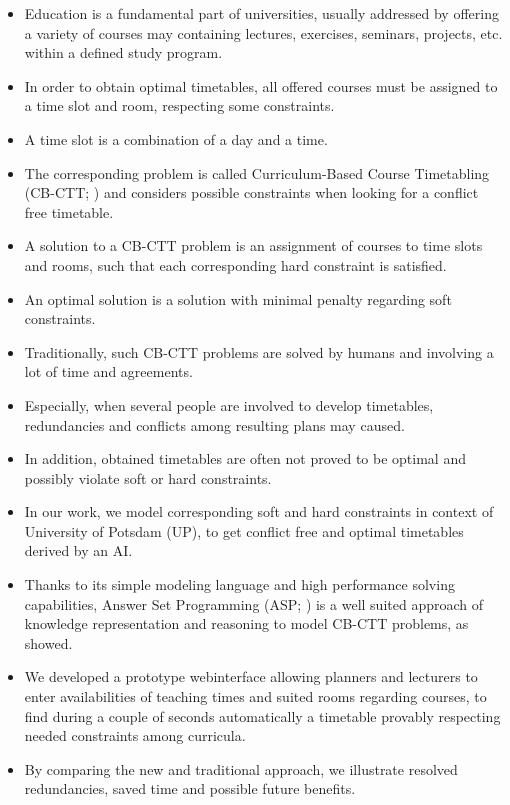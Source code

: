 \documentclass{easychair}
\newcommand{\CBCTT}{CB-CTT}
\newcommand{\UP}{UP}
\newcommand{\ASP}{ASP}
\begin{document}
\begin{itemize}%
  \item%
  Education is a fundamental part of universities, usually addressed by offering a variety of courses may containing lectures, exercises, seminars, projects, etc. within a defined study program. 
  \item%
  In order to obtain optimal timetables, all offered courses must be assigned to a time slot and room, respecting some constraints. 
  \item%
  A time slot is a combination of a day and a time.  
  \item%
  The corresponding problem is called Curriculum-Based Course Timetabling (\CBCTT{}; \cite{becaroto15}) and considers possible constraints when looking for a conflict free timetable. 
  \item%
  A solution to a \CBCTT{} problem is an assignment of courses to time slots and rooms, such that each corresponding hard constraint is satisfied. 
  \item%
  An optimal solution is a solution with minimal penalty regarding soft constraints. 
  \item%
  Traditionally, such \CBCTT{} problems are solved by humans and involving a lot of time and agreements. 
  \item%
  Especially, when several people are involved to develop timetables, redundancies and conflicts among resulting plans may caused. 
  \item%
  In addition, obtained timetables are often not proved to be optimal and possibly violate soft or hard constraints. 
  \item%
  In our work, we model corresponding soft and hard constraints in context of University of Potsdam (\UP{}), to get conflict free and optimal timetables derived by an AI. 
  \item%
  Thanks to its simple modeling language and high performance solving capabilities, Answer Set Programming (\ASP{}; \cite{baral02a}) is a well suited approach of knowledge representation and reasoning to model \CBCTT{} problems, as \cite{bainkaokscsotawa18a} showed.
  \item%
  We developed a prototype webinterface allowing planners and lecturers to enter availabilities of teaching times and suited rooms regarding courses, to find during a couple of seconds automatically a timetable provably respecting needed constraints among curricula. 
  \item%
  By comparing the new and traditional approach, we illustrate resolved redundancies, saved time and possible future benefits. 
\end{itemize}%
\end{document}
